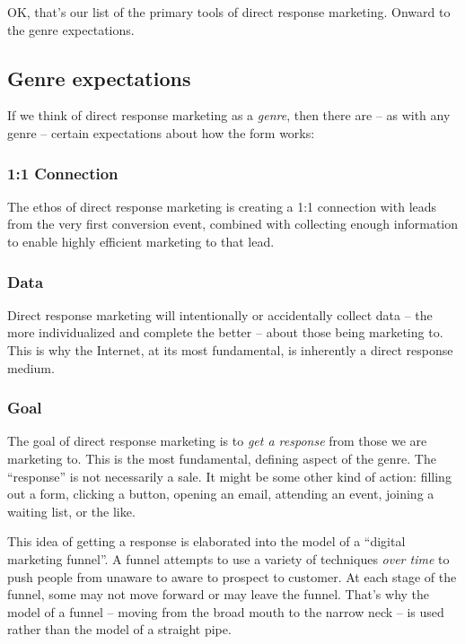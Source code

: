 \documentclass[13pt,]{tufte-handout}
\begin{document}
OK, that's our list of the primary tools of direct response marketing.
Onward to the genre expectations.

\hypertarget{genre-expectations}{%
\subsection{Genre expectations}\label{genre-expectations}}

If we think of direct response marketing as a \emph{genre}, then there
are -- as with any genre -- certain expectations about how the form
works:

\hypertarget{connection}{%
\subsubsection{1:1 Connection}\label{connection}}

The ethos of direct response marketing is creating a 1:1 connection with
leads from the very first conversion event, combined with collecting
enough information to enable highly efficient marketing to that lead.

\hypertarget{data}{%
\subsubsection{Data}\label{data}}

Direct response marketing will intentionally or accidentally collect
data -- the more individualized and complete the better -- about those
being marketing to. This is why the Internet, at its most fundamental,
is inherently a direct response medium.

\hypertarget{goal}{%
\subsubsection{Goal}\label{goal}}

The goal of direct response marketing is to \emph{get a response} from
those we are marketing to. This is the most fundamental, defining aspect
of the genre. The ``response'' is not necessarily a sale. It might be
some other kind of action: filling out a form, clicking a button,
opening an email, attending an event, joining a waiting list, or the
like.

This idea of getting a response is elaborated into the model of a
``digital marketing funnel''. A funnel attempts to use a variety of
techniques \emph{over time} to push people from unaware to aware to
prospect to customer. At each stage of the funnel, some may not move
forward or may leave the funnel. That's why the model of a funnel --
moving from the broad mouth to the narrow neck -- is used rather than
the model of a straight pipe.
\end{document}
